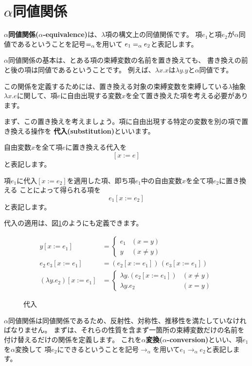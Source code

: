 \section{$\alpha$同値関係}

\textbf{$\alpha$同値関係($\alpha$-equivalence)}は、$\lambda$項の構文上の同値関係です。
項$e_1$と項$e_2$が$\alpha$同値であるということを記号$=_\alpha$を用いて
$e_1 =_\alpha e_2$と表記します。

$\alpha$同値関係の基本は、とある項の束縛変数の名前を置き換えても、
書き換えの前と後の項は同値であるということです。
例えば、$\lambda x . x$は$\lambda y . y$と$\alpha$同値です。

この関係を定義するためには、置き換える対象の束縛変数を束縛している$\lambda$抽象
$\lambda x . e$に関して、項$e$に自由出現する変数$x$を全て置き換えた項を考える必要があります。

まず、この置き換えを考えましょう。項に自由出現する特定の変数を別の項で置き換える操作を
\textbf{代入(substitution)}といいます。

自由変数$x$を全て項$e$に置き換える代入を
\[
  [x := e]
\]
と表記します。

項$e_1$に代入$[x := e_2]$を適用した項、即ち項$e_1$中の自由変数$x$を全て項$e_2$に置き換える
ことによって得られる項を
\[
  e_1 [x := e_2]
\]
と表記します。

代入の適用は、図\ref{fig:lambda-substitute}のようにも定義できます。

\begin{figure}[htbp]
  \begin{align*}
    y [x := e_1] & = \left \{
      \begin{array}{ll}
        e_1 & (x = y) \\
        y & (x \neq y)
      \end{array}
      \right. \\
    e_2 \, e_3 [x := e_1] & = (e_2 [x := e_1]) \, (e_3 [x := e_1]) \\
    (\lambda y . e_2) [x := e_1] & = \left \{
      \begin{array}{ll}
        \lambda y . (e_2 [x := e_1]) & (x \neq y) \\
        \lambda y . e_2 & (x = y)
      \end{array}
      \right.
  \end{align*}
  \caption{代入}
  \label{fig:lambda-substitute}
\end{figure}

$\alpha$同値関係は同値関係であるため、反射性、対称性、推移性を満たしていなければなりません。
まずは、それらの性質を含まず一箇所の束縛変数だけの名前を付け替えるだけの関係を定義します。
これを\textbf{$\alpha$変換($\alpha$-conversion)}といい、項$e_1$を$\alpha$変換して
項$e_2$にできるということを記号$\to_\alpha$を用いて$e_1 \to_\alpha e_2$と表記します。

